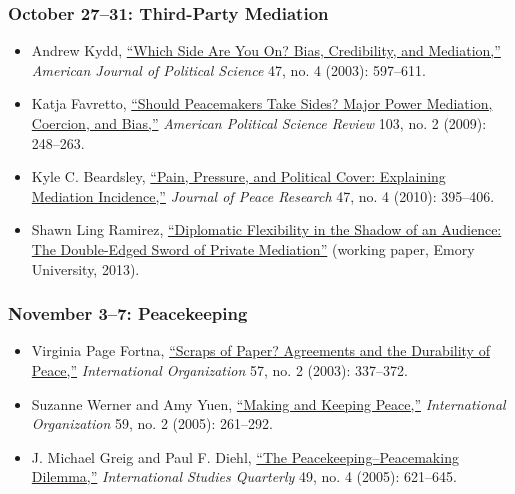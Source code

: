 \subsubsection{October 27--31: Third-Party
Mediation}\label{october-2731-third-party-mediation}

\begin{itemize}
\item
  Andrew Kydd, \href{http://www.jstor.org/stable/3186121}{``Which Side
  Are You On? Bias, Credibility, and Mediation,''} \emph{American
  Journal of Political Science} 47, no. 4 (2003): 597--611.
\item
  Katja Favretto, \href{http://www.jstor.org/stable/27798500}{``Should
  Peacemakers Take Sides? Major Power Mediation, Coercion, and Bias,''}
  \emph{American Political Science Review} 103, no. 2 (2009): 248--263.
\item
  Kyle C. Beardsley, \href{http://www.jstor.org/stable/20752196}{``Pain,
  Pressure, and Political Cover: Explaining Mediation Incidence,''}
  \emph{Journal of Peace Research} 47, no. 4 (2010): 395--406.
\item
  Shawn Ling Ramirez,
  \href{http://slramirez.github.io/lionsden/med20130630.pdf}{``Diplomatic
  Flexibility in the Shadow of an Audience: The Double-Edged Sword of
  Private Mediation''} (working paper, Emory University, 2013).
\end{itemize}

\subsubsection{November 3--7:
Peacekeeping}\label{november-37-peacekeeping}

\begin{itemize}
\item
  Virginia Page Fortna,
  \href{http://www.jstor.org/stable/3594855}{``Scraps of Paper?
  Agreements and the Durability of Peace,''} \emph{International
  Organization} 57, no. 2 (2003): 337--372.
\item
  Suzanne Werner and Amy Yuen,
  \href{http://www.jstor.org/stable/3877905}{``Making and Keeping
  Peace,''} \emph{International Organization} 59, no. 2 (2005):
  261--292.
\item
  J. Michael Greig and Paul F. Diehl,
  \href{http://www.jstor.org/stable/3693503}{``The
  Peacekeeping--Peacemaking Dilemma,''} \emph{International Studies
  Quarterly} 49, no. 4 (2005): 621--645.
\end{itemize}

